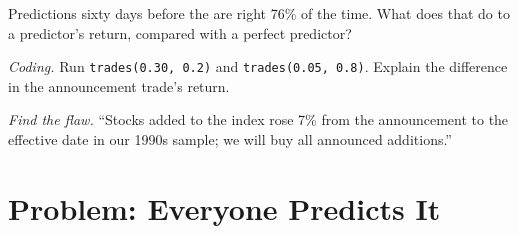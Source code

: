 \begin{exercise}[$\star\star$]\label{exo:s1:index-rebalancing:6}
Predictions sixty days before the  are right 76\% of the time. What does that do to a predictor's return, compared with a perfect predictor?
\end{exercise}

\begin{exercise}[$\star\star\star$]\label{exo:s1:index-rebalancing:7}
\emph{Coding.} Run \texttt{trades(0.30, 0.2)} and \texttt{trades(0.05, 0.8)}. Explain the difference in the announcement trade's return.
\end{exercise}

\begin{exercise}[$\star\star\star$]\label{exo:s1:index-rebalancing:8}
\emph{Find the flaw.} ``Stocks added to the index rose 7\% from the announcement to the effective date in our 1990s sample; we will buy all announced
additions.''
\end{exercise}

\section{Problem: Everyone Predicts It}


